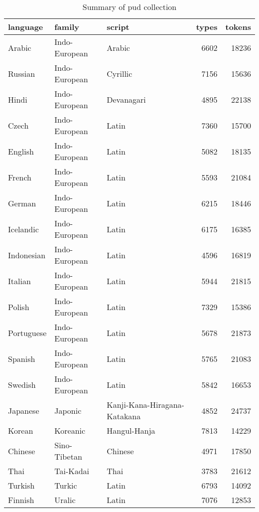 \begin{table}[H]
\centering
\caption{Summary of pud collection} 
\label{tab:coll_summary_pud}
\begin{tabular}{lllrr}
  \hline
language & family & script & types & tokens \\ 
  \hline
Arabic & Indo-European & Arabic & 6602 & 18236 \\ 
  Russian & Indo-European & Cyrillic & 7156 & 15636 \\ 
  Hindi & Indo-European & Devanagari & 4895 & 22138 \\ 
  Czech & Indo-European & Latin & 7360 & 15700 \\ 
  English & Indo-European & Latin & 5082 & 18135 \\ 
  French & Indo-European & Latin & 5593 & 21084 \\ 
  German & Indo-European & Latin & 6215 & 18446 \\ 
  Icelandic & Indo-European & Latin & 6175 & 16385 \\ 
  Indonesian & Indo-European & Latin & 4596 & 16819 \\ 
  Italian & Indo-European & Latin & 5944 & 21815 \\ 
  Polish & Indo-European & Latin & 7329 & 15386 \\ 
  Portuguese & Indo-European & Latin & 5678 & 21873 \\ 
  Spanish & Indo-European & Latin & 5765 & 21083 \\ 
  Swedish & Indo-European & Latin & 5842 & 16653 \\ 
  Japanese & Japonic & Kanji-Kana-Hiragana-Katakana & 4852 & 24737 \\ 
  Korean & Koreanic & Hangul-Hanja & 7813 & 14229 \\ 
  Chinese & Sino-Tibetan & Chinese & 4971 & 17850 \\ 
  Thai & Tai-Kadai & Thai & 3783 & 21612 \\ 
  Turkish & Turkic & Latin & 6793 & 14092 \\ 
  Finnish & Uralic & Latin & 7076 & 12853 \\ 
   \hline
\end{tabular}
\end{table}
